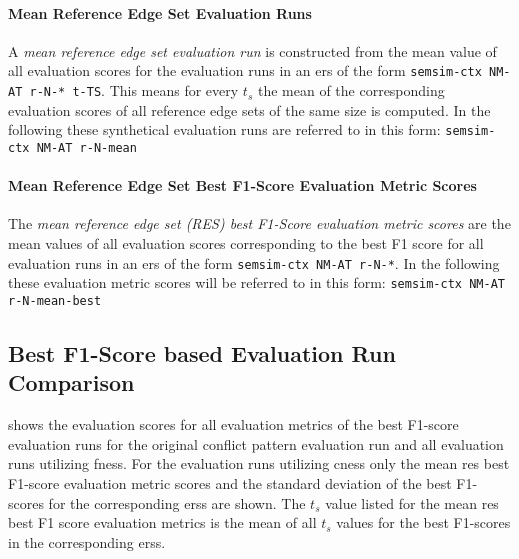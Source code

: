 \documentclass[11pt]{scrreprt}
\begin{document}
{\paragraph{Mean Reference Edge Set Evaluation Runs}
A \textit{mean reference edge set evaluation run} is constructed from the mean value of all evaluation scores for the evaluation runs in an \gls{ers} of the form \texttt{semsim-ctx NM-AT r-N-* t-TS}. This means for every \(t_s\) the mean of the corresponding evaluation scores of all reference edge sets of the same size is computed. In the following these synthetical evaluation runs are referred to in this form: \texttt{semsim-ctx NM-AT r-N-mean}

\paragraph{Mean Reference Edge Set Best F1-Score Evaluation Metric Scores}
The \textit{mean reference edge set (RES) best F1-Score evaluation metric scores} are the mean values of all evaluation scores corresponding to the best F1 score for all evaluation runs in an \gls{ers} of the form \texttt{semsim-ctx NM-AT r-N-*}. In the following these evaluation metric scores will be referred to in this form: \texttt{semsim-ctx NM-AT r-N-mean-best}



\subsection{Best F1-Score based Evaluation Run Comparison}
\label{sec:best-f1-score-eval-run-comparison}
 shows the evaluation scores for all evaluation metrics of the best F1-score evaluation runs for the original conflict pattern evaluation run and all evaluation runs utilizing \gls{fness}. For the evaluation runs utilizing \gls{cness} only the mean \gls{res} best F1-score evaluation metric scores and the standard deviation of the best F1-scores for the corresponding \gls{ers}s are shown. The \(t_s\) value listed for the mean \gls{res} best F1 score evaluation metrics is the mean of all \(t_s\) values for the best F1-scores in the corresponding \gls{ers}s.

}
\end{document}
